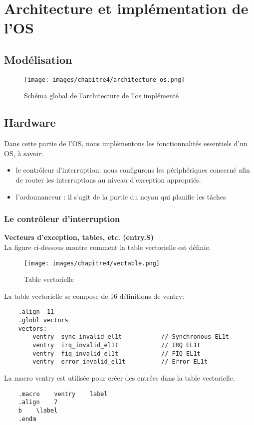 \documentclass[12pt,a4paper,oneside]{book}
\begin{document}
	

\chapter{Architecture et implémentation de l'OS}

\section{Modélisation}

	\begin{figure}[H]
	\centering
	\texttt{[image: images/chapitre4/architecture\_os.png]}
	\caption{Schéma global de l'architecture de l'os implémenté}
	\label{Types}
\end{figure}

\section{Hardware}

Dans cette partie de l'OS, nous implémentons les fonctionnalités essentiels d'un OS, à savoir:
\begin{itemize}
	\item le contrôleur d'interruption: nous configurons les périphériques concerné afin de router les interruptions au niveau d'exception appropriés.
	\item l'ordonnanceur : il s'agit de la partie du noyau qui planifie les tâches
\end{itemize}

\subsection{Le contrôleur d'interruption}
\textbf{Vecteurs d'exception, tables, etc. (entry.S)}\\
La figure ci-dessous montre comment la table vectorielle est définie.
\begin{figure}[H]
	\centering
	\texttt{[image: images/chapitre4/vectable.png]}
	\caption{Table vectorielle}
	\label{Types}
\end{figure}

La table vectorielle se compose de 16 définitions de ventry:\\
\begin{lstlisting}
	.align	11
	.globl vectors 
	vectors:
		ventry	sync_invalid_el1t			// Synchronous EL1t
		ventry	irq_invalid_el1t			// IRQ EL1t
		ventry	fiq_invalid_el1t			// FIQ EL1t
		ventry	error_invalid_el1t			// Error EL1t
\end{lstlisting}
La macro ventry est utilisée pour créer des entrées dans la table vectorielle.\\
\begin{lstlisting}
	.macro    ventry    label
    .align    7
    b    \label
    .endm
\end{lstlisting}
\end{document}

